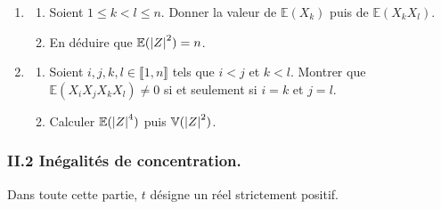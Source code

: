 \begin{enumerate}

\item \begin{enumerate}
           \item Soient $1\leq k < l \leq n$. Donner la valeur de $\mathbb{E}(X_{k})$ puis de $\mathbb{E}(X_{k}X_{l})$.
           \item En déduire que $\mathbb{E}(\left\vert Z\right\vert^{2}) = n$. 
          \end{enumerate}
          
\item \begin{enumerate}
           \item Soient $i,j,k,l\in \llbracket 1, n\rrbracket$ tels que $i < j$ et $k < l$. Montrer que $\mathbb{E}(X_{i}X_{j}X_{k}X_{l}) \neq 0$ si et seulement si $i = k$ et $j = l$.
           \item Calculer $\mathbb{E}(\left\vert Z\right\vert^{4})$ puis $\mathbb{V}(\left\vert Z\right\vert^{2})$.
          \end{enumerate}
\end{enumerate}


\subsubsection*{II.2 Inégalités de concentration.}

Dans toute cette partie, $t$ désigne un réel strictement positif.

